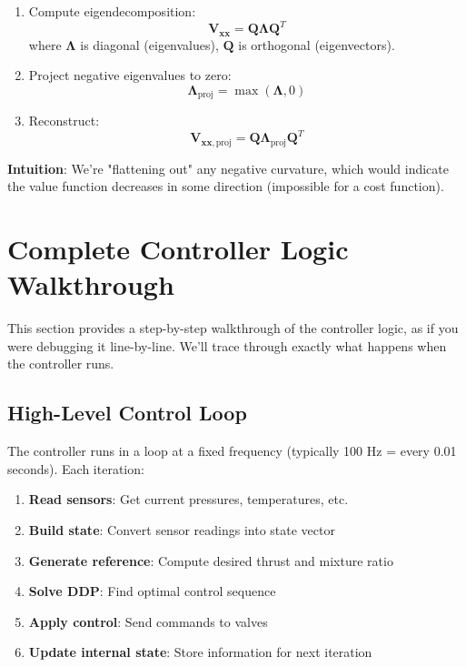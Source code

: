\documentclass[11pt,a4paper]{article}
\begin{document}
\begin{enumerate}
    \item Compute eigendecomposition:
    \begin{equation}
    \mathbf{V}_{\mathbf{xx}} = \mathbf{Q} \boldsymbol{\Lambda} \mathbf{Q}^T
    \end{equation}
    where $\boldsymbol{\Lambda}$ is diagonal (eigenvalues), $\mathbf{Q}$ is orthogonal (eigenvectors).
    
    \item Project negative eigenvalues to zero:
    \begin{equation}
    \boldsymbol{\Lambda}_{\text{proj}} = \max(\boldsymbol{\Lambda}, 0)
    \end{equation}
    
    \item Reconstruct:
    \begin{equation}
    \mathbf{V}_{\mathbf{xx},\text{proj}} = \mathbf{Q} \boldsymbol{\Lambda}_{\text{proj}} \mathbf{Q}^T
    \end{equation}
\end{enumerate}

\textbf{Intuition}: We're "flattening out" any negative curvature, which would indicate the value function decreases in some direction (impossible for a cost function).

\section{Complete Controller Logic Walkthrough}

This section provides a step-by-step walkthrough of the controller logic, as if you were debugging it line-by-line. We'll trace through exactly what happens when the controller runs.

\subsection{High-Level Control Loop}

The controller runs in a loop at a fixed frequency (typically 100 Hz = every 0.01 seconds). Each iteration:

\begin{enumerate}
    \item \textbf{Read sensors}: Get current pressures, temperatures, etc.
    \item \textbf{Build state}: Convert sensor readings into state vector
    \item \textbf{Generate reference}: Compute desired thrust and mixture ratio
    \item \textbf{Solve DDP}: Find optimal control sequence
    \item \textbf{Apply control}: Send commands to valves
    \item \textbf{Update internal state}: Store information for next iteration
\end{enumerate}
\end{document}
